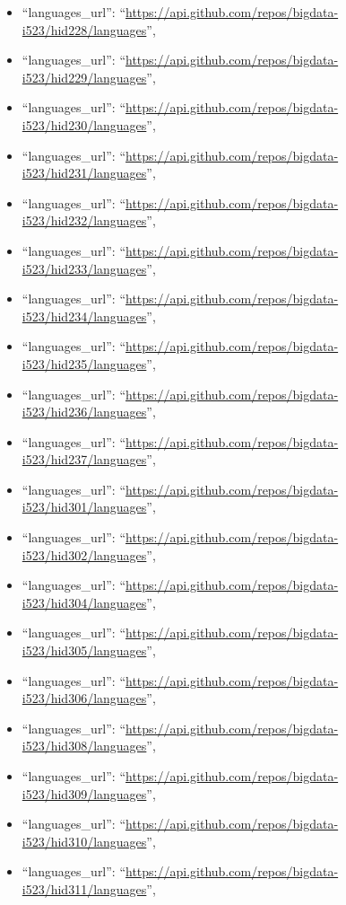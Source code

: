 \begin{itemize}
\item
  ``languages\_url'':
  ``\url{https://api.github.com/repos/bigdata-i523/hid228/languages}'',
\item
  ``languages\_url'':
  ``\url{https://api.github.com/repos/bigdata-i523/hid229/languages}'',
\item
  ``languages\_url'':
  ``\url{https://api.github.com/repos/bigdata-i523/hid230/languages}'',
\item
  ``languages\_url'':
  ``\url{https://api.github.com/repos/bigdata-i523/hid231/languages}'',
\item
  ``languages\_url'':
  ``\url{https://api.github.com/repos/bigdata-i523/hid232/languages}'',
\item
  ``languages\_url'':
  ``\url{https://api.github.com/repos/bigdata-i523/hid233/languages}'',
\item
  ``languages\_url'':
  ``\url{https://api.github.com/repos/bigdata-i523/hid234/languages}'',
\item
  ``languages\_url'':
  ``\url{https://api.github.com/repos/bigdata-i523/hid235/languages}'',
\item
  ``languages\_url'':
  ``\url{https://api.github.com/repos/bigdata-i523/hid236/languages}'',
\item
  ``languages\_url'':
  ``\url{https://api.github.com/repos/bigdata-i523/hid237/languages}'',
\item
  ``languages\_url'':
  ``\url{https://api.github.com/repos/bigdata-i523/hid301/languages}'',
\item
  ``languages\_url'':
  ``\url{https://api.github.com/repos/bigdata-i523/hid302/languages}'',
\item
  ``languages\_url'':
  ``\url{https://api.github.com/repos/bigdata-i523/hid304/languages}'',
\item
  ``languages\_url'':
  ``\url{https://api.github.com/repos/bigdata-i523/hid305/languages}'',
\item
  ``languages\_url'':
  ``\url{https://api.github.com/repos/bigdata-i523/hid306/languages}'',
\item
  ``languages\_url'':
  ``\url{https://api.github.com/repos/bigdata-i523/hid308/languages}'',
\item
  ``languages\_url'':
  ``\url{https://api.github.com/repos/bigdata-i523/hid309/languages}'',
\item
  ``languages\_url'':
  ``\url{https://api.github.com/repos/bigdata-i523/hid310/languages}'',
\item
  ``languages\_url'':
  ``\url{https://api.github.com/repos/bigdata-i523/hid311/languages}'',

\end{itemize}
